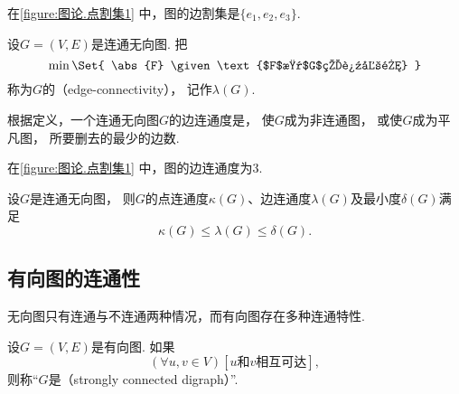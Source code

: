 在\cref{figure:图论.点割集1} 中，图的边割集是\(\{e_1,e_2,e_3\}\).

\begin{definition}
设\(G = (V,E)\)是连通无向图.
把\begin{equation*}
	\min\Set{
		\abs{F}
		\given
		\text{$F$是$G$的边割集}
	}
\end{equation*}称为\(G\)的（edge-connectivity），
记作\(\lambda(G)\).
\end{definition}

根据定义，一个连通无向图\(G\)的边连通度是，
使\(G\)成为非连通图，
或使\(G\)成为平凡图，
所要删去的最少的边数.

在\cref{figure:图论.点割集1} 中，图的边连通度为\(3\).

\begin{theorem}
设\(G\)是连通无向图，
则\(G\)的点连通度\(\kappa(G)\)、边连通度\(\lambda(G)\)及最小度\(\delta(G)\)满足\begin{equation*}
	\kappa(G)
	\leq
	\lambda(G)
	\leq
	\delta(G).
\end{equation*}
\end{theorem}

\subsection{有向图的连通性}
无向图只有连通与不连通两种情况，而有向图存在多种连通特性.

\begin{definition}
设\(G = (V,E)\)是有向图.
如果\begin{equation*}
	(\forall u,v \in V)
	\left[
		\text{$u$和$v$相互可达}
	\right],
\end{equation*}
则称“\(G\)是（strongly connected digraph）”.
\end{definition}

